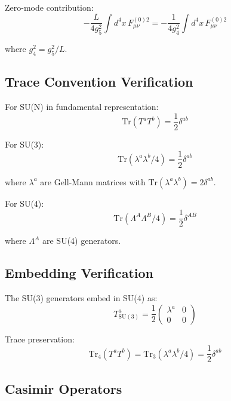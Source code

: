 \documentclass[11pt,a4paper]{article}
\theoremstyle{definition}
\begin{document}
Zero-mode contribution:
\begin{equation}
\label{eq:zero-mode-kinetic}
-\frac{L}{4g_5^2} \int d^4x \, F_{\mu\nu}^{(0)2} =
  -\frac{1}{4g_4^2} \int d^4x \, F_{\mu\nu}^{(0)2}
\end{equation}

where $g_4^2 = g_5^2/L$.

\subsection{Trace Convention Verification}
\label{subsec:trace-verify}

For SU(N) in fundamental representation:
\begin{equation}
\label{eq:trace-fund}
\text{Tr}(T^a T^b) = \frac{1}{2} \delta^{ab}
\end{equation}

For SU(3):
\begin{equation}
\label{eq:trace-su3}
\text{Tr}(\lambda^a \lambda^b / 4) = \frac{1}{2} \delta^{ab}
\end{equation}

where $\lambda^a$ are Gell-Mann matrices with $\text{Tr}(\lambda^a \lambda^b) = 2\delta^{ab}$.

For SU(4):
\begin{equation}
\label{eq:trace-su4}
\text{Tr}(\Lambda^A \Lambda^B / 4) = \frac{1}{2} \delta^{AB}
\end{equation}

where $\Lambda^A$ are SU(4) generators.

\subsection{Embedding Verification}
\label{subsec:embedding-verify}

The SU(3) generators embed in SU(4) as:
\begin{equation}
\label{eq:su3-embed}
T^a_{\text{SU}(3)} = \frac{1}{2}\begin{pmatrix} \lambda^a & 0 \\ 0 & 0 \end{pmatrix}
\end{equation}

Trace preservation:
\begin{equation}
\label{eq:embed-trace}
\text{Tr}_4(T^a T^b) = \text{Tr}_3(\lambda^a \lambda^b / 4) = \frac{1}{2}\delta^{ab}
\end{equation}

\subsection{Casimir Operators}
\label{subsec:casimir}
\end{document}
